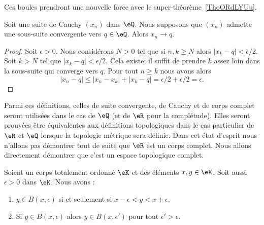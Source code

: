 \begin{normaltext}
	Ces boules prendront une nouvelle force avec le super-théorème~\ref{ThoORdLYUu}.
\end{normaltext}


\begin{proposition}	\label{PROPooJZIMooHOimlv}
	Soit une suite de Cauchy \( (x_n)\) dans \( \eQ\). Nous supposons que \( (x_n)\) admette une sous-suite convergente vers \( q\in \eQ\). Alors \( x_n\to q\).
\end{proposition}

\begin{proof}
	Soit \( \epsilon>0\). Nous considérons \( N>0\) tel que si \( n,k\geq N\) alors \( | x_k-q |<\epsilon/2\). Soit \( k>N\) tel que \( | x_k-q |<\epsilon/2\). Cela existe; il suffit de prendre \( k\) assez loin dans la sous-suite qui converge vers \( q\). Pour tout \( n\geq k\) nous avons alors
	\begin{equation}
		| x_n-q |\leq | x_n-x_k |+| x_k-q |=\epsilon/2+\epsilon/2=\epsilon.
	\end{equation}
\end{proof}

Parmi ces définitions, celles de suite convergente, de Cauchy et de corps complet seront utilisées dans le cas de \( \eQ\) (et de \( \eR\) pour la complétude). Elles seront prouvées être équivalentes aux définitions topologiques dans le cas particulier de \( \eR\) et \( \eQ\) lorsque la topologie métrique sera définie. Dans cet état d'esprit nous n'allons pas démontrer tout de suite que \( \eR\) est un corps complet. Nous allons directement démontrer que c'est un espace topologique complet.

\begin{lemma}       \label{LEMooQXDCooPEABBm}
	Soient un corps totalement ordonné \( \eK\) et des éléments \( x,y\in \eK\). Soit aussi \( \epsilon>0\) dans \( \eK\). Nous avons :
	\begin{enumerate}
		\item       \label{ITEMooXJGVooSebiip}
		      \( y\in B(x,\epsilon)\) si et seulement si \( x-\epsilon<y<x+\epsilon\).
		\item       \label{ITEMooRUBBooRayiMs}
		      Si \( y\in  \overline{ B(x,\epsilon) }  \) alors \( y\in B(x,\epsilon')\) pour tout \( \epsilon'>\epsilon\).
	\end{enumerate}
\end{lemma}

